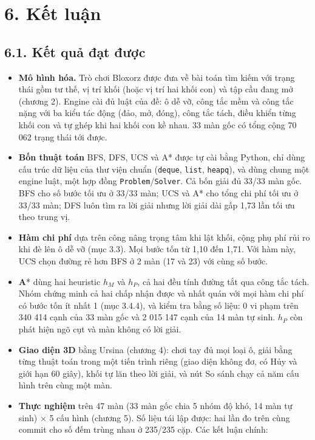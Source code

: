 \section{6. Kết luận}

\subsection{6.1. Kết quả đạt được}

\begin{itemize}
\tightlist
\item
  \textbf{Mô hình hóa.} Trò chơi Bloxorz được đưa về bài toán tìm kiếm với trạng thái gồm tư thế, vị trí khối (hoặc vị trí hai khối con) và tập cầu đang mở (chương 2). Engine cài đủ luật của đề: ô dễ vỡ, công tắc mềm và công tắc nặng với ba kiểu tác động (đảo, mở, đóng), công tắc tách, điều khiển từng khối con và tự ghép khi hai khối con kề nhau. 33 màn gốc có tổng cộng 70 062 trạng thái tới được.
\item
  \textbf{Bốn thuật toán} BFS, DFS, UCS và A* được tự cài bằng Python, chỉ dùng cấu trúc dữ liệu của thư viện chuẩn (\texttt{deque}, \texttt{list}, \texttt{heapq}), và dùng chung một engine luật, một hợp đồng \texttt{Problem}/\texttt{Solver}. Cả bốn giải đủ 33/33 màn gốc. BFS cho số bước tối ưu ở 33/33 màn; UCS và A* cho tổng chi phí tối ưu ở 33/33 màn; DFS luôn tìm ra lời giải nhưng lời giải dài gấp 1,73 lần tối ưu theo trung vị.
\item
  \textbf{Hàm chi phí} dựa trên công nâng trọng tâm khi lật khối, cộng phụ phí rủi ro khi đè lên ô dễ vỡ (mục 3.3). Mọi bước tốn từ 1,10 đến 1,71. Với hàm này, UCS chọn đường rẻ hơn BFS ở 2 màn (17 và 23) với cùng số bước.
\item
  \textbf{A}* dùng hai heuristic \(h_M\) và \(h_P\), cả hai đều tính đường tắt qua công tắc tách. Nhóm chứng minh cả hai chấp nhận được và nhất quán với mọi hàm chi phí có bước tốn ít nhất 1 (mục 3.4.4), và kiểm tra bằng số liệu: 0 vi phạm trên 340 414 cạnh của 33 màn gốc và 2 015 147 cạnh của 14 màn tự sinh. \(h_P\) còn phát hiện ngõ cụt và màn không có lời giải.
\item
  \textbf{Giao diện 3D} bằng Ursina (chương 4): chơi tay đủ mọi loại ô, giải bằng từng thuật toán trong một tiến trình riêng (giao diện không đơ, có Hủy và giới hạn 60 giây), khối tự lăn theo lời giải, và nút So sánh chạy cả năm cấu hình trên cùng một màn.
\item
  \textbf{Thực nghiệm} trên 47 màn (33 màn gốc chia 5 nhóm độ khó, 14 màn tự sinh) × 5 cấu hình (chương 5). Số liệu tái lập được: hai lần đo trên cùng commit cho số đếm trùng nhau ở 235/235 cặp. Các kết luận chính:


\end{itemize}
